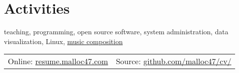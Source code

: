 \documentclass[10pt]{article}
\begin{document}
\section{Activities}
teaching, programming, open source software, system administration,
data visualization, Linux,
\href{https://soundcloud.com/malloc47}{music composition}

\vspace{1em}

\noindent {}%
\begin{tabularx}{\textwidth}{@{}XR@{}}
\footnotesize{Online: \href{http://resume.malloc47.com}{resume.malloc47.com}} &
\footnotesize{Source: \href{https://github.com/malloc47/cv/tree/resume}{github.com/malloc47/cv/}}

\end{tabularx}

\pagestyle{myheadings}

\end{document}
